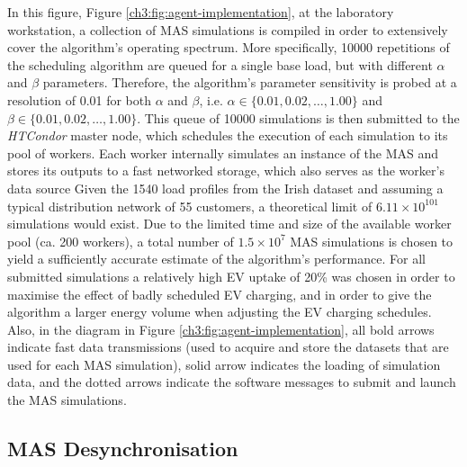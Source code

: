 In this figure, Figure \ref{ch3:fig:agent-implementation}, at the laboratory workstation, a collection of MAS simulations is compiled in order to extensively cover the algorithm's operating spectrum.
More specifically, 10000 repetitions of the scheduling algorithm are queued for a single base load, but with different $\alpha$ and $\beta$ parameters.
Therefore, the algorithm's parameter sensitivity is probed at a resolution of 0.01 for both $\alpha$ and $\beta$, i.e. $\alpha \in \{0.01, 0.02, \dots, 1.00\}$ and $\beta \in \{0.01, 0.02, \dots, 1.00\}$.
This queue of 10000 simulations is then submitted to the \textit{HTCondor} master node, which schedules the execution of each simulation to its pool of workers.
Each worker internally simulates an instance of the MAS and stores its outputs to a fast networked storage, which also serves as the worker's data source
Given the 1540 load profiles from the Irish dataset and assuming a typical distribution network of 55 customers, a theoretical limit of $6.11\times10^{101}$ simulations would exist.
Due to the limited time and size of the available worker pool (ca. 200 workers), a total number of $1.5\times10^{7}$ MAS simulations is chosen to yield a sufficiently accurate estimate of the algorithm's performance.
For all submitted simulations a relatively high EV uptake of 20\% was chosen in order to maximise the effect of badly scheduled EV charging, and in order to give the algorithm a larger energy volume when adjusting the EV charging schedules.
Also, in the diagram in Figure \ref{ch3:fig:agent-implementation}, all bold arrows indicate fast data transmissions (used to acquire and store the datasets that are used for each MAS simulation), solid arrow indicates the loading of simulation data, and the dotted arrows indicate the software messages to submit and launch the MAS simulations.

\subsection{MAS Desynchronisation}
\label{ch3:subsec:desynchronisation}

